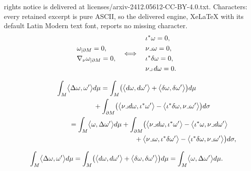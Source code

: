 \documentclass[10pt,a4paper]{amsart}
\begin{document}
rights notice is delivered at licenses/arxiv-2412.05612-CC-BY-4.0.txt. Characters: every retained excerpt is pure ASCII, so the delivered engine, XeLaTeX with its default Latin Modern text font, reports no missing character.
\begin{equation}\label{Zcharacterization}
\begin{aligned}
&\omega_{|\partial M} = 0,\\
&\nabla_\nu\omega_{|\partial M} = 0,
\end{aligned}
\quad\Longleftrightarrow\quad
\begin{aligned}
& \iota^*\omega = 0,\\
& \nu\lrcorner\omega = 0,\\
& \iota^*\delta\omega = 0,\\
& \nu\lrcorner\,{\rm d}\omega = 0.
\end{aligned}
\end{equation}

\begin{gather}
\int_M\bigl\langle\Delta\omega,\omega'\bigr\rangle {\rm d}\mu = \int_M\bigl(\bigl\langle {\rm d}\omega,{\rm d}\omega'\bigr\rangle +\bigl\langle\delta\omega,\delta\omega'\bigr\rangle\bigr) {\rm d}\mu \nonumber\\
\hphantom{\int_M\bigl\langle\Delta\omega,\omega'\bigr\rangle {\rm d}\mu =}{}
+\int_{\partial M}\bigl(\bigl\langle \nu\lrcorner {\rm d}\omega,\iota^*\omega'\bigr\rangle-\bigl\langle\iota^*\delta\omega,\nu\lrcorner\omega'\bigr\rangle\bigr) {\rm d}\sigma \label{eq:laplacianG1}\\
\hphantom{\int_M\bigl\langle\Delta\omega,\omega'\bigr\rangle {\rm d}\mu}{}
= \int_M\bigl\langle\omega,\Delta\omega'\bigr\rangle {\rm d}\mu + \int_{\partial M}\bigl(\bigl\langle\nu\lrcorner
{\rm d}\omega,\iota^*\omega'\bigr\rangle-\bigl\langle\iota^*\omega,\nu\lrcorner
{\rm d}\omega'\bigr\rangle
\nonumber\\
\hphantom{\int_M\bigl\langle\Delta\omega,\omega'\bigr\rangle {\rm d}\mu =\int_M\bigl\langle\omega,\Delta\omega'\bigr\rangle {\rm d}\mu + \int_{\partial M}}{}
+\bigl\langle\nu\lrcorner\omega,
\iota^*\delta\omega'\bigr\rangle-\bigl\langle\iota^*\delta\omega,
\nu\lrcorner\omega'\bigr\rangle\bigr){\rm d}\sigma,\label{eq:laplacianG}
\end{gather}

\begin{equation}\label{eq:laplacian}
\int_M\bigl\langle\Delta\omega,\omega'\bigr\rangle {\rm d}\mu=\int_M\bigl(\bigl\langle {\rm d}\omega,{\rm d}\omega'\bigr\rangle+\bigl\langle\delta\omega,\delta\omega'\bigr\rangle\bigr){\rm d}\mu=\int_M\bigl\langle\omega,\Delta\omega'\bigr\rangle {\rm d}\mu.
\end{equation}
\end{document}

